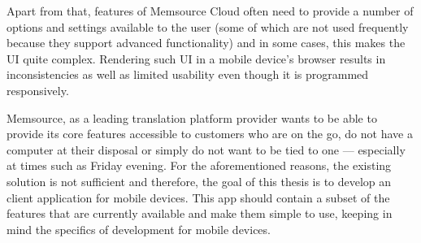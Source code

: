 Apart from that, features of Memsource Cloud often need to provide a number of options and settings available to the user (some of which are not used frequently because they support advanced functionality) and in some cases, this makes the UI quite complex. Rendering such UI in a mobile device's browser results in inconsistencies as well as limited usability even though it is programmed responsively.

Memsource, as a leading translation platform provider wants to be able to provide its core features accessible to customers who are on the go, do not have a computer at their disposal or simply do not want to be tied to one --- especially at times such as Friday evening. For the aforementioned reasons, the existing solution is not sufficient and therefore, the goal of this thesis is to develop an client application for mobile devices. This app should contain a subset of the features that are currently available and make them simple to use, keeping in mind the specifics of development for mobile devices.




